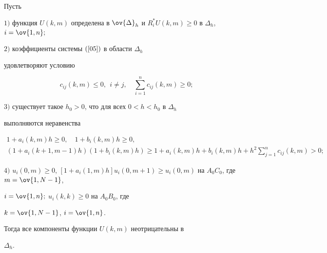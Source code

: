 \begin{thm}


Пусть





$1)$ функция $U(k,m)$ определена в $\ov{\Delta}_h$ и $R^{*}_iU(k,m)


\geq 0$ в $\Delta_h$, $i=\ov{1,n};$





$2)$ коэффициенты системы $(\ref{05})$ в области $\Delta_h$


удовлетворяют условию


\begin{equation}\label{07}


c_{ij}(k,m)\leq 0,\ \ i\ne j,\quad


\sum\limits_{i=1}^{n}c_{ij}(k,m)\geq 0;


\end{equation}





$3)$ существует такое $h_0>0$, что для всех $0<h<h_0$ в $\Delta_h$


выполняются неравенства


\begin{gather}\label{08}


 1+a_i(k,m)h\geq 0, \quad 1+b_i(k,m)h\geq 0, \\


%


\label{081}


(1+a_i(k+1,m-1)h)(1+b_i(k,m)h)\geq 


1 + a_i(k,m)h + b_i(k,m)h + h^2


\sum \limits _ {j=1}^n c_{ij}(k,m) > 0;


\end{gather}





$4)$ $u_i(0,m)\geq 0$, $[ 1+a_i(1,m)h ] u_i(0,m+1) \geq


u_i(0,m)$ на $A_0C_0$, где $m=\ov{1,N-1}$,


$i=\ov{1,n};$ $u_i(k,k)\geq 0$ на $A_0B_0$, где


$k=\ov{1,N-1}$, $i=\ov{1,n}$.





Тогда все компоненты функции $U(k,m)$ неотрицательны в


$\Delta_h$.


\end{thm}








